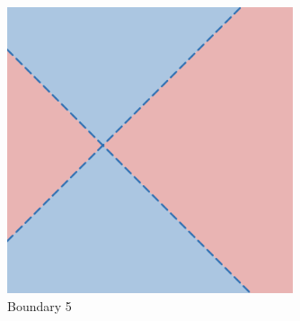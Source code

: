 \begin{figure}[H]
    \centering
    \includegraphics[width=0.75\textwidth]{images/boundaries/cross.png}
    \caption{Boundary 5}
    \label{fig:cross}
\end{figure}